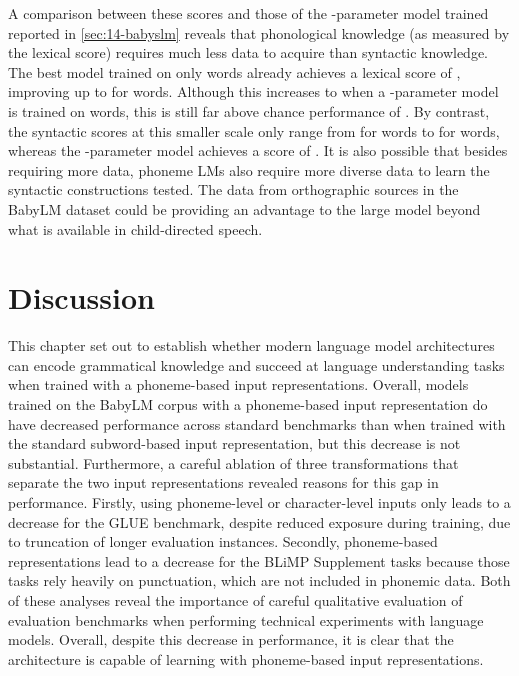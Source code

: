 A comparison between these scores and those of the -parameter model trained reported in \cref{sec:14-babyslm} reveals that phonological knowledge (as measured by the lexical score) requires much less data to acquire than syntactic knowledge. The best model trained on only  words already achieves a lexical score of , improving up to  for  words. Although this increases to  when a -parameter model is trained on  words, this is still far above chance performance of . By contrast, the syntactic scores at this smaller scale only range from  for  words to  for  words, whereas the -parameter model achieves a score of . It is also possible that besides requiring more data, phoneme LMs also require more diverse data to learn the syntactic constructions tested. The data from orthographic sources in the BabyLM dataset could be providing an advantage to the large model beyond what is available in child-directed speech.

\section{Discussion}\label{sec:14-discussion}

This chapter set out to establish whether modern language model architectures can encode grammatical knowledge and succeed at language understanding tasks when trained with a phoneme-based input representations. Overall, \gpt models trained on the BabyLM corpus with a phoneme-based input representation do have decreased performance across standard benchmarks than when trained with the standard subword-based input representation, but this decrease is not substantial. Furthermore, a careful ablation of three transformations that separate the two input representations revealed reasons for this gap in performance. Firstly, using phoneme-level or character-level inputs only leads to a decrease for the GLUE benchmark, despite reduced exposure during training, due to truncation of longer evaluation instances. Secondly, phoneme-based representations lead to a decrease for the BLiMP Supplement tasks because those tasks rely heavily on punctuation, which are not included in phonemic data. Both of these analyses reveal the importance of careful qualitative evaluation of evaluation benchmarks when performing technical experiments with language models. Overall, despite this decrease in performance, it is clear that the \gpt architecture is capable of learning with phoneme-based input representations.

